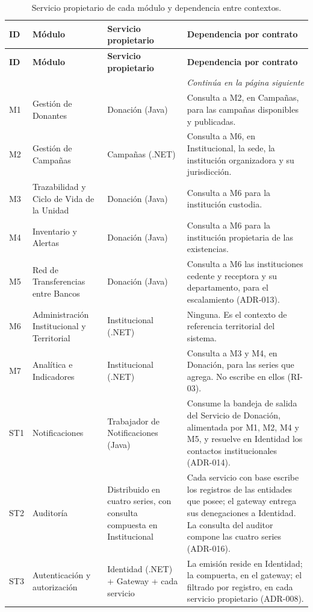 \documentclass[11pt,a4paper]{article}
\newcommand{\contlinea}[1]{\multicolumn{#1}{r}{\footnotesize\itshape Continúa en la página siguiente}}
\begin{document}
\begin{longtable}{L{1.2cm} L{4.2cm} L{3.6cm} L{5.2cm}}
\caption{Servicio propietario de cada módulo y dependencia entre contextos.}\label{tab:repartomodulos}\\
\toprule
\textbf{ID} & \textbf{Módulo} & \textbf{Servicio propietario} & \textbf{Dependencia por contrato} \\
\midrule
\endfirsthead
\toprule
\textbf{ID} & \textbf{Módulo} & \textbf{Servicio propietario} & \textbf{Dependencia por contrato} \\
\midrule
\endhead
\midrule
\contlinea{4} \\
\endfoot
\bottomrule
\endlastfoot
M1 & Gestión de Donantes & Donación (Java) & Consulta a M2, en Campañas, para las campañas disponibles y publicadas. \\
M2 & Gestión de Campañas & Campañas (.NET) & Consulta a M6, en Institucional, la sede, la institución organizadora y su jurisdicción. \\
M3 & Trazabilidad y Ciclo de Vida de la Unidad & Donación (Java) & Consulta a M6 para la institución custodia. \\
M4 & Inventario y Alertas & Donación (Java) & Consulta a M6 para la institución propietaria de las existencias. \\
M5 & Red de Transferencias entre Bancos & Donación (Java) & Consulta a M6 las instituciones cedente y receptora y su departamento, para el escalamiento (ADR-013). \\
M6 & Administración Institucional y Territorial & Institucional (.NET) & Ninguna. Es el contexto de referencia territorial del sistema. \\
M7 & Analítica e Indicadores & Institucional (.NET) & Consulta a M3 y M4, en Donación, para las series que agrega. No escribe en ellos (RI-03). \\
ST1 & Notificaciones & Trabajador de Notificaciones (Java) & Consume la bandeja de salida del Servicio de Donación, alimentada por M1, M2, M4 y M5, y resuelve en Identidad los contactos institucionales (ADR-014). \\
ST2 & Auditoría & Distribuido en cuatro series, con consulta compuesta en Institucional & Cada servicio con base escribe los registros de las entidades que posee; el gateway entrega sus denegaciones a Identidad. La consulta del auditor compone las cuatro series (ADR-016). \\
ST3 & Autenticación y autorización & Identidad (.NET) + Gateway + cada servicio & La emisión reside en Identidad; la compuerta, en el gateway; el filtrado por registro, en cada servicio propietario (ADR-008). \\
\end{longtable}
\end{document}

